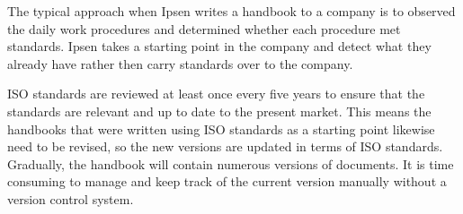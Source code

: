 The typical approach when Ipsen writes a handbook to a company is to observed the daily work procedures and determined whether each procedure met standards. Ipsen takes a starting point in the company and detect what they already have rather then carry standards over to the company.


ISO standards are reviewed at least once every five years to ensure that the standards are relevant and up to date to the present market\cite{ISOreviewedevery5years}. This means the handbooks that were written using ISO standards as a starting point likewise need to be revised, so the new versions are updated in terms of ISO standards. Gradually, the handbook will contain numerous versions of documents. It is time consuming to manage and keep track of the current version manually without a version control system.
